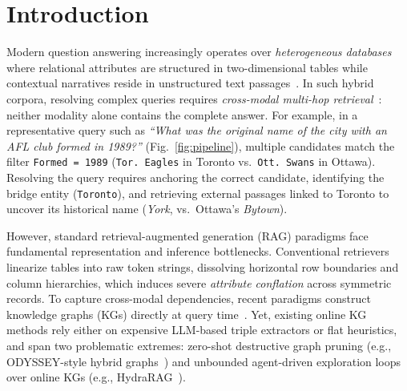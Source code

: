\documentclass[runningheads]{llncs}
\begin{document}
\section{Introduction}
Modern question answering increasingly operates over \emph{heterogeneous databases} where relational attributes are structured in two-dimensional tables while contextual narratives reside in unstructured text passages~\cite{zhou2026tableqasurvey}. In such hybrid corpora, resolving complex queries requires \emph{cross-modal multi-hop retrieval}~\cite{hybridqa}: neither modality alone contains the complete answer. For example, in a representative query such as \emph{``What was the original name of the city with an AFL club formed in 1989?''} (Fig.~\ref{fig:pipeline}), multiple candidates match the filter \texttt{Formed = 1989} (\texttt{Tor. Eagles} in Toronto vs.\ \texttt{Ott. Swans} in Ottawa). Resolving the query requires anchoring the correct candidate, identifying the bridge entity (\texttt{Toronto}), and retrieving external passages linked to Toronto to uncover its historical name (\emph{York}, vs.\ Ottawa's \emph{Bytown}).

However, standard retrieval-augmented generation (RAG) paradigms face fundamental representation and inference bottlenecks. Conventional retrievers linearize tables into raw token strings, dissolving horizontal row boundaries and column hierarchies, which induces severe \emph{attribute conflation} across symmetric records. To capture cross-modal dependencies, recent paradigms construct knowledge graphs (KGs) directly at query time~\cite{agarwal2025hybrid,peng2024graphragsurvey}. Yet, existing online KG methods rely either on expensive LLM-based triple extractors or flat heuristics, and span two problematic extremes: zero-shot destructive graph pruning (e.g., ODYSSEY-style hybrid graphs~\cite{agarwal2025hybrid}) and unbounded agent-driven exploration loops over online KGs (e.g., HydraRAG~\cite{tan2025hydrarag}).
\end{document}
